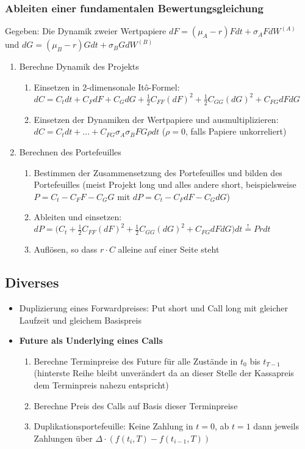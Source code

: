 \subsubsection{Ableiten einer fundamentalen Bewertungsgleichung}
Gegeben: Die Dynamik zweier Wertpapiere \(dF = (\mu_A-r)Fdt+\sigma_AFdW^{(A)}\) und \(dG = (\mu_B-r)Gdt+\sigma_BGdW^{(B)}\)
\begin{enumerate}
	\item Berechne Dynamik des Projekts
	\begin{enumerate}
		\item Einsetzen in 2-dimensonale Itô-Formel: \(dC = C_tdt + C_FdF + C_GdG + \frac{1}{2}C_{FF}(dF)^2 + \frac{1}{2}C_{GG}(dG)^2 + C_{FG}dFdG\)
		\item Einsetzen der Dynamiken der Wertpapiere und ausmultiplizieren: \(dC = C_tdt + ... + C_{FG}\sigma_A\sigma_BFG\rho dt\) (\(\rho=0\), falls Papiere unkorreliert)
	\end{enumerate}
	\item Berechnen des Portefeuilles
	\begin{enumerate}
		\item Bestimmen der Zusammensetzung des Portefeuilles und bilden des Portefeuilles (meist Projekt long und alles andere short, beispielsweise \(P = C_t-C_FF-C_GG\) mit \(dP = C_t-C_FdF-C_GdG\))
		\item Ableiten und einsetzen: \(dP = \Big(C_t + \frac{1}{2}C_{FF}(dF)^2 + \frac{1}{2}C_{GG}(dG)^2 + C_{FG}dFdG\Big)dt \stackrel{!}{=} Prdt\)
		\item Auflösen, so dass \(r\cdot C\) alleine auf einer Seite steht
	\end{enumerate}
\end{enumerate}

\subsection{Diverses}
\begin{itemize}
	\item Duplizierung eines Forwardpreises: Put short und Call long mit gleicher Laufzeit und gleichem Basispreis
	\item \textbf{Future als Underlying eines Calls}
	\begin{enumerate}
		\item Berechne Terminpreise des Future für alle Zustände in \(t_0\) bis \(t_{T-1}\) (hinterste Reihe bleibt unverändert da an dieser Stelle der Kassapreis dem Terminpreis nahezu entspricht)
		\item Berechne Preis des Calls auf Basis dieser Terminpreise
		\item Duplikationsportefeuille: Keine Zahlung in \(t=0\), ab \(t=1\) dann jeweils Zahlungen über \(\Delta\cdot(f(t_i,T)-f(t_{i-1},T))\)
	\end{enumerate}
\end{itemize}
